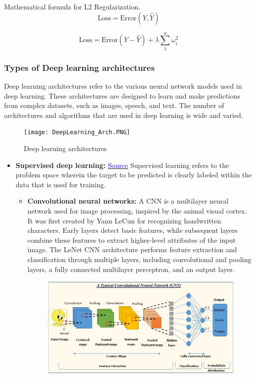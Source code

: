 \begin{itemize}
\begin{itemize}
    Mathematical formula for L2 Regularization.
    \[
    \text{Loss}=\text{Error}(Y,\hat{Y})
    \]
    
    \[
    \text{Loss}=\text{Error}(Y-\hat{Y}) + \lambda\sum_{1}^{n}\omega_{i}^{2}
    \]
    
\end{itemize}

\subsubsection{Types of Deep learning architectures}

Deep learning architectures refer to the various neural network models used in deep learning. These architectures are designed to learn and make predictions from complex datasets, such as images, speech, and text.
The number of architectures and algorithms that are used in deep learning is wide and varied.
\begin{figure}[H]
    \centering\texttt{[image: DeepLearning\_Arch.PNG]}
    \caption{Deep learning architectures \cite{madhavan2017deep}}
\end{figure}
\begin{itemize}
    \item \textbf{Supervised deep learning: }
    \href{https://developer.ibm.com/articles/cc-machine-learning-deep-learning-architectures/}{\textcolor{blue}{Source}}
    Supervised learning refers to the problem space wherein the target to be predicted is clearly labeled within the data that is used for training.
    \begin{itemize}
        \item \textbf{Convolutional neural networks: } A CNN is a multilayer neural network used for image processing, inspired by the animal visual cortex. It was first created by Yann LeCun for recognizing handwritten characters. Early layers detect basic features, while subsequent layers combine these features to extract higher-level attributes of the input image. The LeNet CNN architecture performs feature extraction and classification through multiple layers, including convolutional and pooling layers, a fully connected multilayer perceptron, and an output layer. 
        \begin{figure}[H]
            \centering
            \includegraphics[width=0.8\linewidth]{tex/img/CNN.jpeg}

\end{figure}
\end{itemize}
\end{itemize}
\end{itemize}
